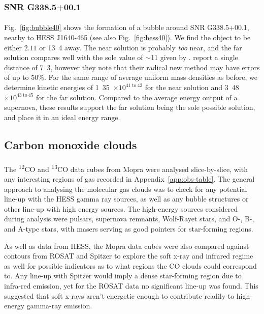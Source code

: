 \documentclass[a4paper, titlepage, oneside]{article}
\newcommand{\elem}[2]{\textsuperscript{#1}{#2}}
\newcommand{\e}[1]{\ensuremath{\times 10^{#1}}}
\newcommand{\parsec}{\mathrm{pc}}
\begin{document}
\begin{multicols}{2}
\subsubsection{SNR G338.5+00.1}
\paragraph{}
Fig.~\ref{fig:bubble40} shows the formation of a bubble around SNR G338.5+00.1, nearby to HESS J1640-465 (see also Fig.~\ref{fig:hess40}). We find the object to be either \(2.11\) or \unit{13.4}{\kilo\parsec} away. The near solution is probably \textit{too} near, and the far solution compares well with the sole value of \(\sim\)\unit{11}{\kilo\parsec} given by \textcite{Kothes:2007}. \textcite{Pavlovic:2013} report a single distance of \unit{7.3}{\kilo\parsec}, however they note that their radical new method may have errors of up to 50\%. For the same range of average uniform mass densities as before, we determine kinetic energies of \unit{1.35\e{41 \mathrm{~to~} 43}}{\joule} for the near solution and \unit{3.48\e{43 \mathrm{~to~} 45}}{\joule} for the far solution. Compared to the average energy output of a supernova, these results support the far solution being the sole possible solution, and place it in an ideal energy range.

\subsection{Carbon monoxide clouds}
\paragraph{}
The \elem{12}{C}O and \elem{13}{C}O data cubes from Mopra were analysed slice-by-slice, with any interesting regions of gas recorded in Appendix~\ref{app:obs-table}. The general approach to analysing the molecular gas clouds was to check for any potential line-up with the HESS gamma ray sources, as well as any bubble structures or other line-up with high energy sources. The high-energy sources considered during analysis were pulsars, supernova remnants, Wolf-Rayet stars, and O-, B-, and A-type stars, with masers serving as good pointers for star-forming regions.

As well as data from HESS, the Mopra data cubes were also compared against contours from ROSAT and Spitzer to explore the soft x-ray and infrared regime as well for possible indicators as to what regions the CO clouds could correspond to. Any line-up with Spitzer would imply a dense star-forming region due to infra-red emission, yet for the ROSAT data no significant line-up was found. This suggested that soft x-rays aren't energetic enough to contribute readily to high-energy gamma-ray emission.


\end{multicols}
\end{document}
